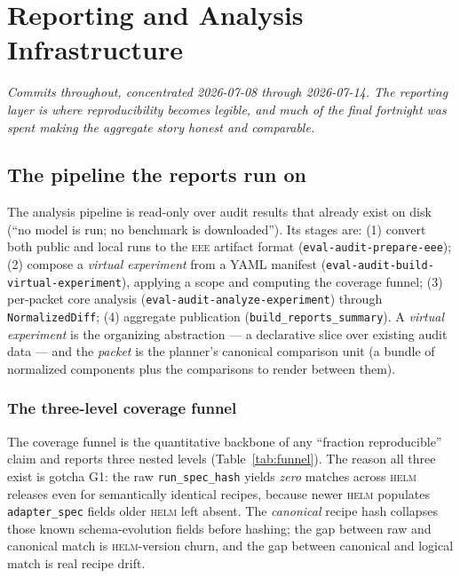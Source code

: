 \documentclass[11pt]{report}
\newcommand{\eeeshort}{\textsc{eee}\xspace}
\newcommand{\code}[1]{\texttt{#1}}
\begin{document}
\chapter{Reporting and Analysis Infrastructure}
\label{chap:reporting}

\emph{Commits throughout, concentrated 2026-07-08 through 2026-07-14. The reporting
layer is where reproducibility becomes legible, and much of the final fortnight was
spent making the aggregate story honest and comparable.}

\section{The pipeline the reports run on}

The analysis pipeline is read-only over audit results that already exist on disk
(``no model is run; no benchmark is downloaded''). Its stages are: (1) convert both
public and local runs to the \eeeshort artifact format
(\code{eval-audit-prepare-eee}); (2) compose a \emph{virtual experiment} from a
YAML manifest (\code{eval-audit-build-virtual-experiment}), applying a scope and
computing the coverage funnel; (3) per-packet core analysis
(\code{eval-audit-analyze-experiment}) through \code{NormalizedDiff}; (4) aggregate
publication (\code{build\_reports\_summary}). A \emph{virtual experiment} is the
organizing abstraction --- a declarative slice over existing audit data --- and the
\emph{packet} is the planner's canonical comparison unit (a bundle of normalized
components plus the comparisons to render between them).

\subsection{The three-level coverage funnel}
\label{sec:funnel}

The coverage funnel is the quantitative backbone of any ``fraction reproducible''
claim and reports three nested levels (Table~\ref{tab:funnel}). The reason all
three exist is gotcha G1: the raw \code{run\_spec\_hash} yields \emph{zero} matches
across \textsc{helm} releases even for semantically identical recipes, because
newer \textsc{helm} populates \code{adapter\_spec} fields older \textsc{helm} left
absent. The \emph{canonical} recipe hash collapses those known schema-evolution
fields before hashing; the gap between raw and canonical match is
\textsc{helm}-version churn, and the gap between canonical and logical match is
real recipe drift.
\end{document}
